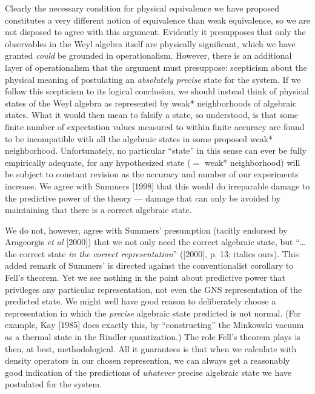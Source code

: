 \documentclass[12pt]{article}
\theoremstyle{remark}
\theoremstyle{definition}
\begin{document}
Clearly the necessary condition for physical equivalence we have
proposed constitutes a very different notion of equivalence than weak
equivalence, so we are not disposed to agree with this argument.
Evidently it presupposes that only the observables in the Weyl algebra
itself are physically significant, which we have granted \emph{could}
be grounded in operationalism.  However, there is an additional layer
of operationalism that the argument must presuppose: scepticism about
the physical meaning of postulating an \emph{absolutely precise} state
for the system.  If we follow this scepticism to its logical
conclusion, we should instead think of physical states of the Weyl
algebra as represented by weak* neighborhoods of algebraic states.
What it would then mean to falsify a state, so understood, is that
some finite number of expectation values measured to within finite
accuracy are found to be incompatible with all the algebraic states in
some proposed weak* neighborhood.  Unfortunately, no particular
``state'' in this sense can ever be fully empirically adequate, for
any hypothesized state ($=$ weak* neighborhood) will be subject to
constant revision as the accuracy and number of our experiments
increase.  We agree with Summers [1998] that this would do irreparable
damage to the predictive power of the theory --- damage that can only
be avoided by maintaining that there is a correct algebraic state.
 
We do not, however, agree with Summers' presumption (tacitly endorsed
by Arageorgis \emph{et al} [2000]) that we not only need the correct
algebraic state, but ``\ldots the correct state \emph{in the correct
  representation}'' ([2000], p. 13; italics ours).  This added remark
of Summers' is directed against the conventionalist corollary to
Fell's theorem. Yet we see nothing in the point about predictive power
that privileges any particular representation, not even the GNS
representation of the predicted state.  We might well have good reason
to deliberately choose a representation in which the \emph{precise}
algebraic state predicted is not normal. (For example, Kay [1985] does
exactly this, by ``constructing'' the Minkowski vacuum as a thermal
state in the Rindler quantization.)  The role Fell's theorem plays is
then, at best, methodological.  All it guarantees is that when we
calculate with density operators in our chosen represention, we can
always get a reasonably good indication of the predictions of
\emph{whatever} precise algebraic state we have postulated for the
system.
 
\end{document}
